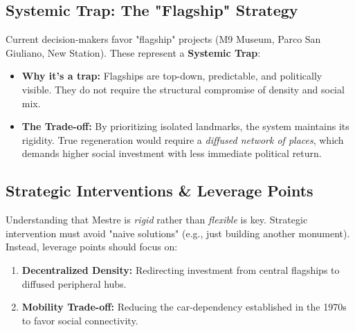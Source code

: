 \documentclass[a4paper,11pt]{article}
\begin{document}
\subsection*{Systemic Trap: The "Flagship" Strategy}
Current decision-makers favor "flagship" projects (M9 Museum, Parco San Giuliano, New Station). These represent a \textbf{Systemic Trap}:
\begin{itemize}
    \item \textbf{Why it's a trap:} Flagships are top-down, predictable, and politically visible. They do not require the structural compromise of density and social mix.
    \item \textbf{The Trade-off:} By prioritizing isolated landmarks, the system maintains its rigidity. True regeneration would require a \textit{diffused network of places}, which demands higher social investment with less immediate political return.
\end{itemize}

\subsection*{Strategic Interventions \& Leverage Points}
Understanding that Mestre is \textit{rigid} rather than \textit{flexible} is key. Strategic intervention must avoid "naive solutions" (e.g., just building another monument). Instead, leverage points should focus on:
\begin{enumerate}
    \item \textbf{Decentralized Density:} Redirecting investment from central flagships to diffused peripheral hubs.
    \item \textbf{Mobility Trade-off:} Reducing the car-dependency established in the 1970s to favor social connectivity.
\end{enumerate}
\end{document}

